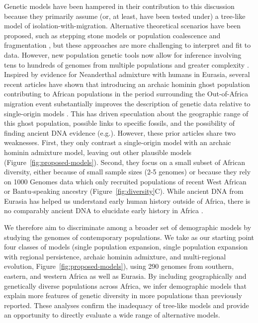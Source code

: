 \documentclass[]{article}
\begin{document}
Genetic models have been hampered in their contribution to this discussion
because they primarily assume (or, at least, have been tested under) a
tree-like model of isolation-with-migration. Alternative theoretical scenarios
have been proposed, such as stepping stone models \citep{Arredondo2021-qa} or
population coalescence and fragmentation \citep{Scerri2019-xg}, but these
approaches are more challenging to interpret and fit to data.
However, new population genetic tools now allow for inference involving tens to
hundreds of genomes from multiple populations and greater complexity
\citep{Kamm2020-vn,Ragsdale2019-nt,Speidel2019-nj}. Inspired by evidence for
Neanderthal admixture with humans in Eurasia, several recent articles
have shown that introducing an archaic hominin ghost population contributing to African
populations in the period surrounding the Out-of-Africa migration event
substantially improves the description of genetic data relative to
single-origin models
\citep{Plagnol2006-lt,Hammer2011-bx,Hsieh2016-gk,Hey2018-pw,Ragsdale2019-nt,Lorente-Galdos2019-vz,Durvasula2020-td}.
This has driven speculation about the geographic range of this ghost
population, possible links to specific fossils, and the possibility of
finding ancient DNA evidence (e.g.\citep{Hsieh2016-gk}). However, these prior
articles share two weaknesses. First, they only contrast a single-origin model
with an archaic hominin admixture model, leaving out other plausible models
\citep{Henn2018-rf} (Figure~\ref{fig:proposed-models}).
Second, they
focus on a small subset of African diversity, either because of small sample
sizes (2-5 genomes) or because they rely on 1000 Genomes data which only
recruited populations of recent West African or Bantu-speaking ancestry
(Figure~\ref{fig:diversity}C). 
While ancient DNA from Eurasia has helped us understand early human history
outside of Africa, there is no comparably ancient DNA to elucidate early history
in Africa \citep{Lipson2022-xf}.

We therefore aim to discriminate among a broader set of demographic
models by studying the genomes of contemporary populations. We take as our
starting point four classes of models (single population expansion, single
population expansion with regional persistence, archaic hominin admixture, and
multi-regional evolution, Figure~\ref{fig:proposed-models}), using 290
genomes from southern, eastern, and western Africa as well as Eurasia. By
including geographically and genetically diverse populations across Africa, we
infer demographic models that explain more features of genetic diversity
in more
populations than previously reported. These analyses confirm the inadequacy of
tree-like models and provide an opportunity to directly evaluate a wide range
of alternative models. 
\end{document}
